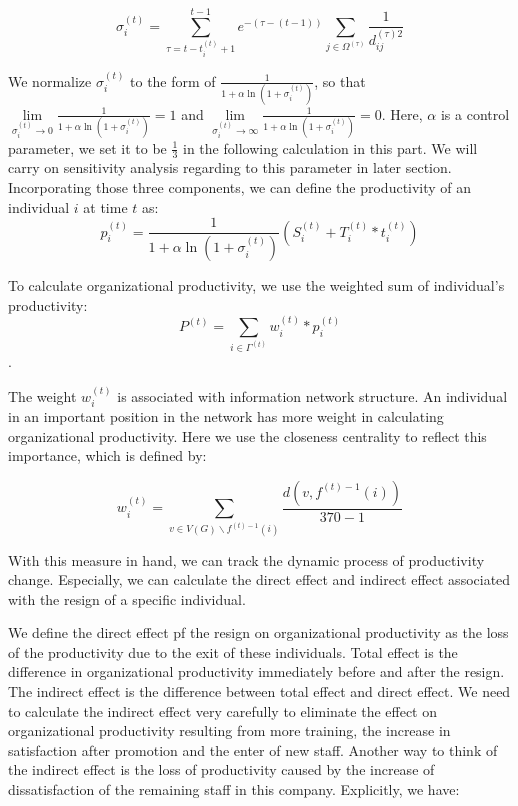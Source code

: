 \documentclass[tcn = 37075, sheet = true, abstract = true]{mcmthesis}
\begin{document}
$$\displaystyle \sigma_i^{(t)}=\sum_{\tau=t-t_i^{(t)}+1}^{t-1}e^{-(\tau-(t-1))}\sum_{j\in \Omega^{(\tau)}}\frac{1}{d_{ij}^{(\tau)2}}$$

We normalize $\sigma_i^{(t)}$ to the form of $\displaystyle \frac{1}{1+\alpha\ln{(1+\sigma_i^{(t)})}}$, so that $\lim\limits_{\sigma_i^{(t)}\rightarrow 0} \displaystyle \frac{1}{1+\alpha\ln{(1+\sigma_i^{(t)})}}=1$ and $\lim\limits_{\sigma_i^{(t)}\rightarrow \infty} \displaystyle \frac{1}{1+\alpha\ln{(1+\sigma_i^{(t)})}}=0$. Here, $\alpha$ is a control parameter, we set it to be $\displaystyle \frac{1}{3}$ in the following calculation in this part. We will carry on sensitivity analysis regarding to this parameter in later section.\\

Incorporating those three components, we can define the productivity of an individual $i$ at time $t$ as:
$$\displaystyle p_i^{(t)}=\frac{1}{1+\alpha\ln{(1+\sigma_i^{(t)})}}(S_i^{(t)}+T_i^{(t)}*t_i^{(t)})$$

To calculate organizational productivity, we use the weighted sum of individual's productivity: 
$$P^{(t)}=\sum\limits_{i\in\Gamma^{(t)}} w_i^{(t)}*p_i^{(t)}$$.

The weight $w_i^{(t)}$ is associated with information network structure. An individual in an important position in the network has more weight in calculating organizational productivity. Here we use the closeness centrality to reflect this importance, which is defined by:

$$\displaystyle w_i^{(t)}=\sum\limits_{v\in V(G)\backslash f^{(t)-1}(i)}\frac{d(v,f^{(t)-1}(i))}{370-1}$$

With this measure in hand, we can track the dynamic process of productivity change. Especially, we can calculate the direct effect and indirect effect associated with the resign of a specific individual.

We define the direct effect pf the resign on organizational productivity as the loss of the productivity due to the exit of these individuals. Total effect is the difference in organizational productivity immediately before and after the resign. The indirect effect is the difference between total effect and direct effect. We need to calculate the indirect effect very carefully to eliminate the effect on organizational productivity resulting from more training, the increase in satisfaction after promotion and the enter of new staff. Another way to think of the indirect effect is the loss of productivity caused by the increase of dissatisfaction of the remaining staff in this company. Explicitly, we have:
\end{document}
